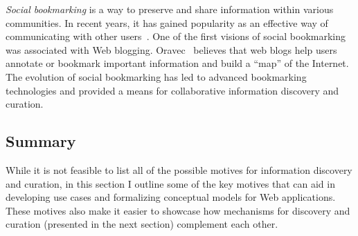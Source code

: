 {{\textit{Social bookmarking} is a way to preserve and share information within various communities. In recent years, it has gained popularity as an effective way of communicating with other users~\cite{estelles2010social}. One of the first visions of social bookmarking was associated with Web blogging. Oravec~\cite{oravec2002bookmarking} believes that web blogs help users annotate or bookmark important information and build a ``map'' of the Internet. The evolution of social bookmarking has led to advanced bookmarking technologies and provided a means for collaborative information discovery and curation. 
}
{\subsection{Summary}
While it is not feasible to list all of the possible motives for information discovery and curation, in this section I outline some of the key motives that can aid in developing use cases and formalizing conceptual models for Web applications. These motives also make it easier to showcase how mechanisms for discovery and curation (presented in the next section) complement each other.
} 
}

